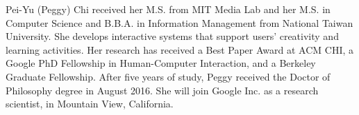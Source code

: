 \markboth{}{}

Pei-Yu (Peggy) Chi received her M.S. from MIT Media Lab and her M.S. in Computer Science and B.B.A. in Information Management from National Taiwan University. She develops interactive systems that support users' creativity and learning activities. Her research has received a Best Paper Award at ACM CHI, a Google PhD Fellowship in Human-Computer Interaction, and a Berkeley Graduate Fellowship.
%
After five years of study, Peggy received the Doctor of Philosophy degree in August 2016. She will join Google Inc. as a research scientist, in Mountain View, California.

